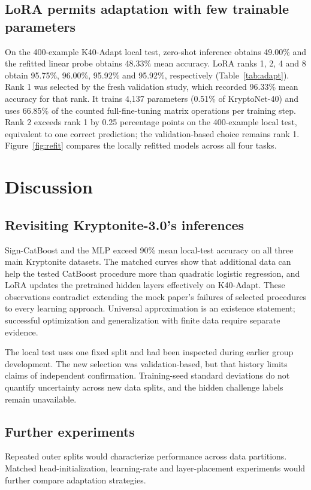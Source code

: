 \documentclass{article}
\begin{document}
\subsection{LoRA permits adaptation with few trainable parameters}
On the 400-example K40-Adapt local test, zero-shot inference obtains 49.00\% and the refitted linear probe obtains 48.33\% mean accuracy. LoRA ranks 1, 2, 4 and 8 obtain 95.75\%, 96.00\%, 95.92\% and 95.92\%, respectively (Table~\ref{tab:adapt}). Rank 1 was selected by the fresh validation study, which recorded 96.33\% mean accuracy for that rank. It trains 4,137 parameters (0.51\% of KryptoNet-40) and uses 66.85\% of the counted full-fine-tuning matrix operations per training step. Rank 2 exceeds rank 1 by 0.25 percentage points on the 400-example local test, equivalent to one correct prediction; the validation-based choice remains rank 1. Figure~\ref{fig:refit} compares the locally refitted models across all four tasks.

\section{Discussion}
\subsection{Revisiting Kryptonite-3.0's inferences}
Sign-CatBoost and the MLP exceed 90\% mean local-test accuracy on all three main Kryptonite datasets. The matched curves show that additional data can help the tested CatBoost procedure more than quadratic logistic regression, and LoRA updates the pretrained hidden layers effectively on K40-Adapt. These observations contradict extending the mock paper's failures of selected procedures to every learning approach. Universal approximation is an existence statement; successful optimization and generalization with finite data require separate evidence.

The local test uses one fixed split and had been inspected during earlier group development. The new selection was validation-based, but that history limits claims of independent confirmation. Training-seed standard deviations do not quantify uncertainty across new data splits, and the hidden challenge labels remain unavailable.

\subsection{Further experiments}
Repeated outer splits would characterize performance across data partitions. Matched head-initialization, learning-rate and layer-placement experiments would further compare adaptation strategies.
\end{document}
